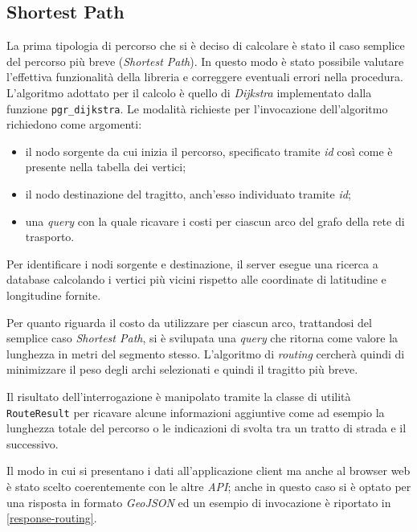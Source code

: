 \subsection{Shortest Path}
La prima tipologia di percorso che si è deciso di calcolare è stato il caso semplice del percorso più breve (\emph{Shortest Path}). In questo modo è stato possibile valutare l'effettiva funzionalità della libreria e correggere eventuali errori nella procedura.
L'algoritmo adottato per il calcolo è quello di \emph{Dijkstra} implementato dalla funzione \texttt{pgr\_dijkstra}. Le modalità richieste per l'invocazione dell'algoritmo richiedono come argomenti:
\begin{itemize}
\item il nodo sorgente da cui inizia il percorso, specificato tramite \emph{id} così come è presente nella tabella dei vertici;
\item il nodo destinazione del tragitto, anch'esso individuato tramite \emph{id};
\item una \emph{query} con la quale ricavare i costi per ciascun arco del grafo della rete di trasporto.
\end{itemize}
Per identificare i nodi sorgente e destinazione, il server esegue una ricerca a database calcolando i vertici più vicini rispetto alle coordinate di latitudine e longitudine fornite. 

Per quanto riguarda il costo da utilizzare per ciascun arco, trattandosi del semplice caso \emph{Shortest Path}, si è svilupata una \emph{query} che ritorna come valore la lunghezza in metri del segmento stesso. L'algoritmo di \emph{routing} cercherà quindi di minimizzare il peso degli archi selezionati e quindi il tragitto più breve.

Il risultato dell'interrogazione è manipolato tramite la classe di utilità \texttt{RouteResult} per ricavare alcune informazioni aggiuntive come ad esempio la lunghezza totale del percorso o le indicazioni di svolta tra un tratto di strada e il successivo. 

Il modo in cui si presentano i dati all'applicazione client ma anche al browser web è stato scelto coerentemente con le altre \emph{API}; anche in questo caso si è optato per una risposta in formato \emph{GeoJSON} ed un esempio di invocazione è riportato in \ref{response-routing}.

